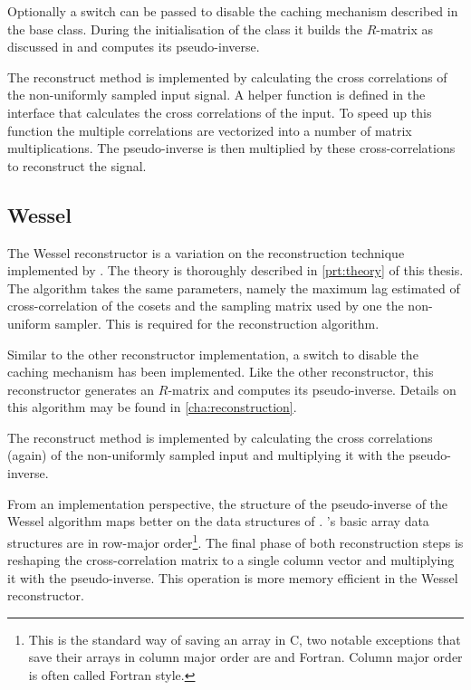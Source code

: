 \documentclass[a4paper, openany, oneside]{memoir}
\begin{document}
Optionally a switch can be passed to disable the caching mechanism described in the base class. During the initialisation of the class it builds the $R$-matrix as discussed in \cite{ariananda2012compressive} and computes its pseudo-inverse.

The reconstruct method is implemented by calculating the cross correlations of the non-uniformly sampled input signal. A helper function is defined in the  interface that calculates the cross correlations of the input. To speed up this function the multiple correlations are vectorized into a number of matrix multiplications. The pseudo-inverse is then multiplied by these cross-correlations to reconstruct the signal.

\subsection{Wessel}
\label{sub:wessel}
The Wessel reconstructor is a variation on the reconstruction technique implemented by . The theory is thoroughly described in \cref{prt:theory} of this thesis. The algorithm takes the same parameters, namely the maximum lag estimated of cross-correlation of the cosets and the sampling matrix used by one the non-uniform sampler. This is required for the reconstruction algorithm.

Similar to the other reconstructor implementation, a switch to disable the caching mechanism has been implemented. Like the other reconstructor, this reconstructor generates an $R$-matrix and computes its pseudo-inverse. Details on this algorithm may be found in \cref{cha:reconstruction}.

The reconstruct method is implemented by calculating the cross correlations (again) of the non-uniformly sampled input and multiplying it with the pseudo-inverse.

From an implementation perspective, the structure of the pseudo-inverse of the Wessel algorithm maps better on the data structures of . 's basic array data structures are in row-major order\footnote{This is the standard way of saving an array in C, two notable exceptions that save their arrays in column major order are \matlab{} and Fortran. Column major order is often called Fortran style.}. The final phase of both reconstruction steps is reshaping the cross-correlation matrix to a single column vector and multiplying it with the pseudo-inverse. This operation is more memory efficient in the Wessel reconstructor.
\end{document}
